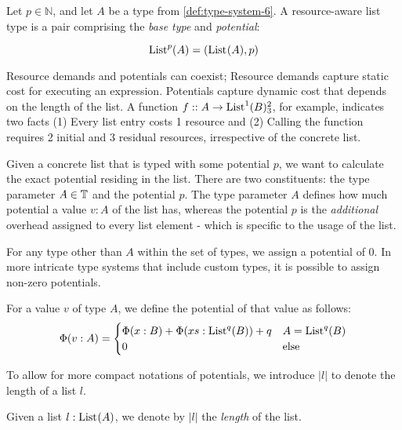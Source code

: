 \begin{definition}\label{def:ra-list}
   Let \(p \in \mathbb{N}\), and let \(A\) be a type from \cref{def:type-system-6}. A resource-aware list type is a pair comprising the \emph{base type} and \emph{potential}:

   \[
      \text{List}^{p}(A) = (\text{List}^{}(A), p)
   \]
\end{definition}

\begin{remark}
   Resource demands and potentials can coexist; Resource demands capture static cost for executing an expression. Potentials capture dynamic cost that depends on the length of the list. A function \(f :: A \to \text{List}^{1}(B) ^{2}_{3}\), for example, indicates two facts (1) Every list entry costs 1 resource and (2) Calling the function requires 2 initial and 3 residual resources, irrespective of the concrete list.
\end{remark}

Given a concrete list that is typed with some potential \(p\), we want to calculate the exact potential residing in the list. There are two constituents: the type parameter \(A \in \mathbb{T}\) and the potential \(p\). The type parameter \(A\) defines how much potential a value \(v : A\) of the list has, whereas the potential \(p\) is the \emph{additional} overhead assigned to every list element - which is specific to the usage of the list.

For any type other than \(A\) within the set of types, we assign a potential of 0. In more intricate type systems that include custom types, it is possible to assign non-zero potentials. 

\begin{definition}\label{def:potential-function}
   For a value \(v\) of type \(A\), we define the potential of that value as follows:
   \[
      \Phi(v : A) = \begin{cases}
         \Phi(x : B) + \Phi(xs : \text{List}^{q}(B)) + q   & A = \text{List}^{q}(B)\\
         0                                            & \text{else}
      \end{cases}
   \]
\end{definition}

To allow for more compact notations of potentials, we introduce \(|l|\) to denote the length of a list \(l\). 

\begin{definition}\label{def:list-length}
   Given a list \(l : \text{List}^{}(A)\), we denote by \(|l|\) the \emph{length} of the list.
\end{definition}

